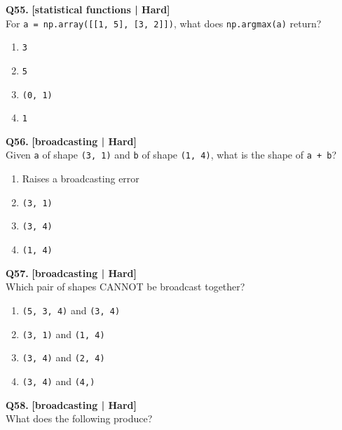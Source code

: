 \noindent\textbf{Q55.} \hfill {\small\color{LPUOrange}\textbf{[statistical functions | Hard]}}\\[2pt]
For \texttt{a = np.array([[1, 5], [3, 2]])}, what does \texttt{np.argmax(a)} return?

\begin{enumerate}[label=(\alph*),topsep=2pt,itemsep=1pt,partopsep=0pt,parsep=0pt]
    \item \relax \texttt{3}
    \item \relax \texttt{5}
    \item \relax \texttt{(0, 1)}
    \item \relax \texttt{1}
\end{enumerate}
\vspace{2mm}

\noindent\textbf{Q56.} \hfill {\small\color{LPUOrange}\textbf{[broadcasting | Hard]}}\\[2pt]
Given \texttt{a} of shape \texttt{(3, 1)} and \texttt{b} of shape \texttt{(1, 4)}, what is the shape of \texttt{a + b}?

\begin{enumerate}[label=(\alph*),topsep=2pt,itemsep=1pt,partopsep=0pt,parsep=0pt]
    \item \relax Raises a broadcasting error
    \item \relax \texttt{(3, 1)}
    \item \relax \texttt{(3, 4)}
    \item \relax \texttt{(1, 4)}
\end{enumerate}
\vspace{2mm}

\noindent\textbf{Q57.} \hfill {\small\color{LPUOrange}\textbf{[broadcasting | Hard]}}\\[2pt]
Which pair of shapes CANNOT be broadcast together?

\begin{enumerate}[label=(\alph*),topsep=2pt,itemsep=1pt,partopsep=0pt,parsep=0pt]
    \item \relax \texttt{(5, 3, 4)} and \texttt{(3, 4)}
    \item \relax \texttt{(3, 1)} and \texttt{(1, 4)}
    \item \relax \texttt{(3, 4)} and \texttt{(2, 4)}
    \item \relax \texttt{(3, 4)} and \texttt{(4,)}
\end{enumerate}
\vspace{2mm}

\noindent\textbf{Q58.} \hfill {\small\color{LPUOrange}\textbf{[broadcasting | Hard]}}\\[2pt]
What does the following produce? 

